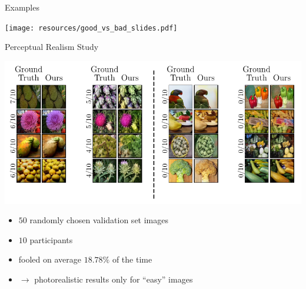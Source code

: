 \documentclass{beamer}
\begin{document}
\begin{frame}{Examples}
  \begin{center}
    \texttt{[image: resources/good\_vs\_bad\_slides.pdf]}
  \end{center}
\end{frame}

\begin{frame}{Perceptual Realism Study}
  \begin{center}
    \includegraphics[width=\textwidth]{resources/amt_results_slides.pdf}
  \end{center}

  \begin{itemize}
    \item $50$ randomly chosen validation set images
    \item $10$ participants
    \item fooled on average $18.78\%$ of the time
    \item $\rightarrow$ photorealistic results only for ``easy'' images
  \end{itemize}
\end{frame}
\end{document}
